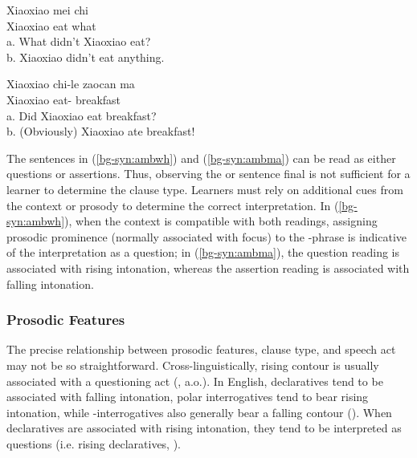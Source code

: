 \vspace{-2ex}
\noindent 
\begin{minipage}[t]{0.45\linewidth}	
\gll Xiaoxiao	mei	chi	\\
Xiaoxiao	\Neg{}	eat	what\\
a.	What didn't Xiaoxiao eat?\\
b.	Xiaoxiao didn't eat anything.\\
\eex
\end{minipage}
\hspace{0.5cm} %
\begin{minipage}[t]{0.5\linewidth} 
\gll Xiaoxiao	chi-le		zaocan		ma\\
	Xiaoxiao	eat-\Asp{}	breakfast	\Sfp{}\\
a.	Did Xiaoxiao eat breakfast?\\
b.	(Obviously) Xiaoxiao ate breakfast!\\
\eex
\end{minipage}
\vspace{-1.5ex}

\noindent 
The sentences in (\ref{bg-syn:ambwh}) and (\ref{bg-syn:ambma}) can be read as either questions or assertions. Thus, observing the \twh{}  or sentence final \ma{} is not sufficient for a learner to determine the clause type. Learners must rely on additional cues from the context or prosody to determine the correct interpretation. In (\ref{bg-syn:ambwh}), when the context is compatible with both readings, assigning prosodic prominence (normally associated with focus) to the \twh-phrase is indicative of the interpretation as a question; in (\ref{bg-syn:ambma}), the question reading is associated with rising intonation, whereas the assertion reading is associated with falling intonation. 

		\subsubsection{Prosodic Features}\label{bg-feature:pro}
\noindent The precise relationship between prosodic features, clause type, and speech act may not be so straightforward. Cross-linguistically, rising contour is usually associated with a questioning act (\citealt{bolinger1978, ladd1981, gussenhovenchen2000, ladd2001typology}, a.o.). In English, declaratives tend to be associated with falling intonation, polar interrogatives tend to bear rising intonation, while \twh-interrogatives also generally bear a falling contour (\citealt{ladd1981, hedberg2014corpus}). When declaratives are associated with rising intonation, they tend to be interpreted as questions (i.e. rising declaratives, \citealt{ladd1981,gunlogson2004,gunlogson2008,jeong2018,rudin2018}).  

